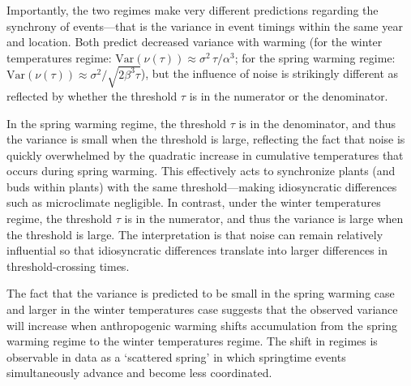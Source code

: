 \documentclass[
]{article}
\begin{document}
Importantly, the two regimes make very different predictions regarding the synchrony of events---that is the variance in event timings within the same year and location. Both predict decreased variance with warming (for the winter temperatures regime: $\mathrm{Var}(\nu(\tau)) \approx \sigma^2 \, \tau / \alpha^3$; for the spring warming regime: $\mathrm{Var}(\nu(\tau)) \approx \sigma^2 / \sqrt{2 \beta^{3} \tau}$), but the influence of noise is strikingly different as reflected by whether the threshold $\tau$ is in the numerator or the denominator. %

In the spring warming regime, the threshold $\tau$ is in the denominator, and thus the variance is small when the threshold is large, reflecting the fact that noise is quickly overwhelmed by the quadratic increase in cumulative temperatures that occurs during spring warming. This effectively acts to synchronize plants (and buds within plants) with the same threshold---making idiosyncratic differences such as microclimate negligible. In contrast, under the winter temperatures regime, the threshold $\tau$ is in the numerator, and thus the variance is large when the threshold is large. The interpretation is that noise can remain relatively influential so that idiosyncratic differences translate into larger differences in threshold-crossing times. %

The fact that the variance is predicted to be small in the spring warming case and larger in the winter temperatures case suggests that the observed variance will increase when anthropogenic warming shifts accumulation from the spring warming regime to the winter temperatures regime. The shift in regimes is observable in data as a `scattered spring' in which springtime events simultaneously advance and become less coordinated.
\end{document}
